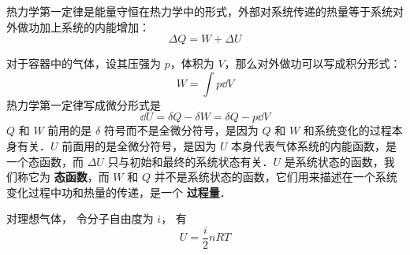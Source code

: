 
\begin{issues}
\issueDraft
\end{issues}


热力学第一定律是能量守恒在热力学中的形式，外部对系统传递的热量等于系统对外做功加上系统的内能增加：
\begin{equation}\label{Th1Law_eq1}
\Delta Q = W + \Delta U
\end{equation}

对于容器中的气体，设其压强为 $p$，体积为 $V$，那么对外做功可以写成积分形式：
\begin{equation}
W = \int p \dd{V}
\end{equation}
热力学第一定律写成微分形式是
\begin{equation}
\dd U=\delta Q-\delta W=\delta Q-p\dd V
\end{equation}
$Q$ 和 $W$ 前用的是 $\delta$ 符号而不是全微分符号，是因为 $Q$ 和 $W$ 和系统变化的过程本身有关．$U$ 前面用的是全微分符号，是因为 $U$ 本身代表气体系统的内能函数，是一个态函数，而 $\Delta U$ 只与初始和最终的系统状态有关．$U$ 是系统状态的函数，我们称它为 \textbf{态函数}，而 $W$ 和 $Q$ 并不是系统状态的函数，它们用来描述在一个系统变化过程中功和热量的传递，是一个 \textbf{过程量}．

对理想气体， 令分子自由度为 $i$， 有
\begin{equation}
U = \frac{i}{2}n RT
\end{equation}

